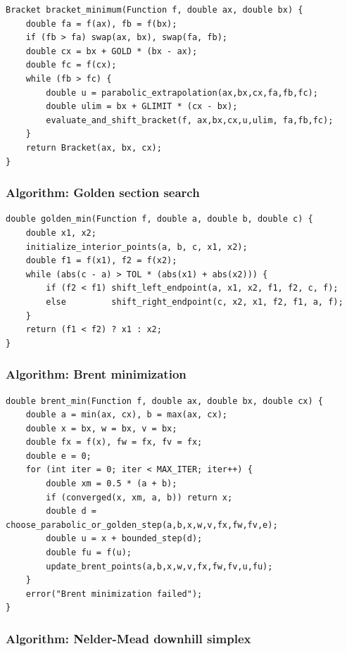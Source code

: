 \documentclass[11pt]{article}
\begin{document}
\begin{verbatim}
Bracket bracket_minimum(Function f, double ax, double bx) {
    double fa = f(ax), fb = f(bx);
    if (fb > fa) swap(ax, bx), swap(fa, fb);
    double cx = bx + GOLD * (bx - ax);
    double fc = f(cx);
    while (fb > fc) {
        double u = parabolic_extrapolation(ax,bx,cx,fa,fb,fc);
        double ulim = bx + GLIMIT * (cx - bx);
        evaluate_and_shift_bracket(f, ax,bx,cx,u,ulim, fa,fb,fc);
    }
    return Bracket(ax, bx, cx);
}
\end{verbatim}

\subsubsection{Algorithm: Golden section search}\label{algorithm-golden-section-search}

\begin{verbatim}
double golden_min(Function f, double a, double b, double c) {
    double x1, x2;
    initialize_interior_points(a, b, c, x1, x2);
    double f1 = f(x1), f2 = f(x2);
    while (abs(c - a) > TOL * (abs(x1) + abs(x2))) {
        if (f2 < f1) shift_left_endpoint(a, x1, x2, f1, f2, c, f);
        else         shift_right_endpoint(c, x2, x1, f2, f1, a, f);
    }
    return (f1 < f2) ? x1 : x2;
}
\end{verbatim}

\subsubsection{Algorithm: Brent minimization}\label{algorithm-brent-minimization}

\begin{verbatim}
double brent_min(Function f, double ax, double bx, double cx) {
    double a = min(ax, cx), b = max(ax, cx);
    double x = bx, w = bx, v = bx;
    double fx = f(x), fw = fx, fv = fx;
    double e = 0;
    for (int iter = 0; iter < MAX_ITER; iter++) {
        double xm = 0.5 * (a + b);
        if (converged(x, xm, a, b)) return x;
        double d = choose_parabolic_or_golden_step(a,b,x,w,v,fx,fw,fv,e);
        double u = x + bounded_step(d);
        double fu = f(u);
        update_brent_points(a,b,x,w,v,fx,fw,fv,u,fu);
    }
    error("Brent minimization failed");
}
\end{verbatim}

\subsubsection{Algorithm: Nelder-Mead downhill simplex}\label{algorithm-nelder-mead-downhill-simplex}
\end{document}

